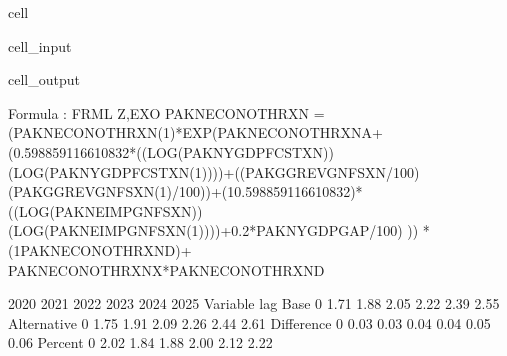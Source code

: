 \documentclass[letterpaper,10pt,english]{jupyterBook}
\begin{document}
\begin{sphinxuseclass}{cell}\begin{sphinxVerbatimInput}

\begin{sphinxuseclass}{cell_input}
\begin{sphinxVerbatim}[commandchars=\\\{\}]
 
    \PYG{p}{[}\PYG{p}{]}
\end{sphinxVerbatim}

\end{sphinxuseclass}\end{sphinxVerbatimInput}
\begin{sphinxVerbatimOutput}

\begin{sphinxuseclass}{cell_output}
\begin{sphinxVerbatim}[commandchars=\\\{\}]
Formula        : FRML \PYGZlt{}Z,EXO\PYGZgt{} PAKNECONOTHRXN = (PAKNECONOTHRXN(\PYGZhy{}1)*EXP(\PYGZhy{}PAKNECONOTHRXN\PYGZus{}A+ (0.598859116610832*((LOG(PAKNYGDPFCSTXN))\PYGZhy{}(LOG(PAKNYGDPFCSTXN(\PYGZhy{}1))))+((PAKGGREVGNFSXN/100)\PYGZhy{}(PAKGGREVGNFSXN(\PYGZhy{}1)/100))+(1\PYGZhy{}0.598859116610832)*((LOG(PAKNEIMPGNFSXN))\PYGZhy{}(LOG(PAKNEIMPGNFSXN(\PYGZhy{}1))))+0.2*PAKNYGDPGAP\PYGZus{}/100) )) * (1\PYGZhy{}PAKNECONOTHRXN\PYGZus{}D)+ PAKNECONOTHRXN\PYGZus{}X*PAKNECONOTHRXN\PYGZus{}D  \PYGZdl{} 

                      2020       2021       2022       2023       2024       2025
Variable    lag                                                                  
Base        0         1.71       1.88       2.05       2.22       2.39       2.55
Alternative 0         1.75       1.91       2.09       2.26       2.44       2.61
Difference  0         0.03       0.03       0.04       0.04       0.05       0.06
Percent     0         2.02       1.84       1.88       2.00       2.12       2.22


\end{sphinxVerbatim}
\end{sphinxuseclass}
\end{sphinxVerbatimOutput}
\end{sphinxuseclass}
\end{document}
